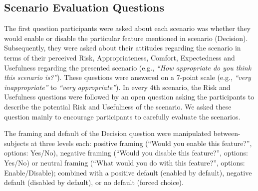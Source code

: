 \subsection{Scenario Evaluation Questions}
\label{sec:questions}
The first question participants were asked about each scenario was whether they would enable or disable the particular feature mentioned in scenario (Decision). Subsequently, they were asked about their attitudes regarding the scenario in terms of their perceived Risk, Appropriateness, Comfort, Expectedness and Usefulness regarding the presented scenario (e.g., \emph{``How appropriate do you think this scenario is?''}). These questions were answered on a 7-point scale (e.g., \emph{``very inappropriate''} to \emph{``very appropriate''}). In every 4th scenario, the Risk and Usefulness questions were followed by an open question asking the participants to describe the potential Risk and Usefulness of the scenario. We asked these question mainly to encourage participants to carefully evaluate the scenarios.%

The framing and default of the Decision question were manipulated between-subjects at three levels each: positive framing (``Would you enable this feature?'', options: Yes/No), negative framing (``Would you disable this feature?'', options: Yes/No) or neutral framing (``What would you do with this feature?'', options: Enable/Disable); combined with a positive default (enabled by default), negative default (disabled by default), or no default (forced choice).



